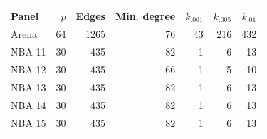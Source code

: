 \begin{tabular}{lrrrrrr}
\toprule
Panel & $p$ & Edges & Min. degree & $k_{.001}$ & $k_{.005}$ & $k_{.01}$\\
\midrule
Arena & 64 & 1265 & 76 & 43 & 216 & 432\\
NBA 11 & 30 & 435 & 82 & 1 & 6 & 13\\
NBA 12 & 30 & 435 & 66 & 1 & 5 & 10\\
NBA 13 & 30 & 435 & 82 & 1 & 6 & 13\\
NBA 14 & 30 & 435 & 82 & 1 & 6 & 13\\
NBA 15 & 30 & 435 & 82 & 1 & 6 & 13\\
\bottomrule
\end{tabular}
